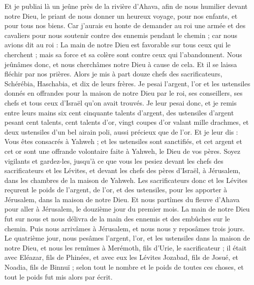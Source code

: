 \begin{multicols}{2}
Et je publiai là un jeûne près de la rivière d'Ahava, afin de nous humilier devant notre Dieu, le priant de nous donner un heureux voyage, pour nos enfants, et pour tous nos biens.
Car j'aurais eu honte de demander au roi une armée et des cavaliers pour nous soutenir contre des ennemis pendant le chemin ; car nous avions dit au roi : La main de notre Dieu est favorable sur tous ceux qui le cherchent ; mais sa force et sa colère sont contre ceux qui l'abandonnent.
Nous jeûnâmes donc, et nous cherchâmes notre Dieu à cause de cela. Et il se laissa fléchir par nos prières.
Alors je mis à part douze chefs des sacrificateurs, Schérébia, Haschabia, et dix de leurs frères.
Je pesai l'argent, l'or et les ustensiles donnés en offrandes pour la maison de notre Dieu par le roi, ses conseillers, ses chefs et tous ceux d'Israël qu'on avait trouvés.
Je leur pesai donc, et je remis entre leurs mains six cent cinquante talents d'argent, des ustensiles d'argent pesant cent talents, cent talents d'or,
vingt coupes d'or valant mille drachmes, et deux ustensiles d'un bel airain poli, aussi précieux que de l'or.
Et je leur dis : Vous êtes consacrés à Yahweh ; et les ustensiles sont sanctifiés, et cet argent et cet or sont une offrande volontaire faite à Yahweh, le Dieu de vos pères.
Soyez vigilants et gardez-les, jusqu'à ce que vous les pesiez devant les chefs des sacrificateurs et les Lévites, et devant les chefs des pères d'Israël, à Jérusalem, dans les chambres de la maison de Yahweh.
Les sacrificateurs donc et les Lévites reçurent le poids de l'argent, de l'or, et des ustensiles, pour les apporter à Jérusalem, dans la maison de notre Dieu.
Et nous partîmes du fleuve d'Ahava pour aller à Jérusalem, le douzième jour du premier mois. La main de notre Dieu fut sur nous et nous délivra de la main des ennemis et des embûches sur le chemin.
Puis nous arrivâmes à Jérusalem, et nous nous y reposâmes trois jours.
Le quatrième jour, nous pesâmes l'argent, l'or, et les ustensiles dans la maison de notre Dieu, et nous les remîmes à Merémoth, fils d'Urie, le sacrificateur ; il était avec Eléazar, fils de Phinées, et avec eux les Lévites Jozabad, fils de Josué, et Noadia, fils de Binnuï ;
selon tout le nombre et le poids de toutes ces choses, et tout le poids fut mis alors par écrit.

\end{multicols}
